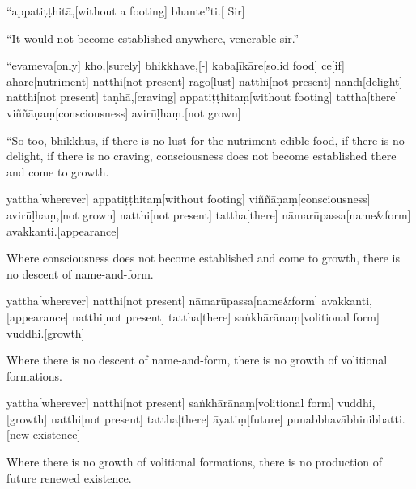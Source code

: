 \begin{samepage}
\begingl[glneveryline={\PaliGlossA,\PaliGlossB}]
“appatiṭṭhitā,[without a footing] bhante”ti.[ Sir]
\endgl
\nopagebreak
\linespread{0.5}
\begin{spacin}{0.2}
{\PaliGlossFT “It would not become established anywhere, venerable sir.”}
\end{spacin}
\vskip 12pt
\end{samepage}
\begin{samepage}
\begingl[glneveryline={\PaliGlossA,\PaliGlossB}]
“evameva[only] kho,[surely] bhikkhave,[-] kabaḷīkāre[solid food] ce[if] āhāre[nutriment] natthi[not present] rāgo[lust] natthi[not present] nandī[delight] natthi[not present] taṇhā,[craving] appatiṭṭhitaṃ[without footing] tattha[there] viññāṇaṃ[consciousness] avirūḷhaṃ.[not grown]
\endgl
\nopagebreak
\linespread{0.5}
\begin{spacin}{0.2}
{\PaliGlossFT “So too, bhikkhus, if there is no lust for the nutriment edible food, if there is no delight, if there is no craving, consciousness does not become established there and come to growth.}
\end{spacin}
\vskip 12pt
\end{samepage}
\begin{samepage}
\begingl[glneveryline={\PaliGlossA,\PaliGlossB}]
yattha[wherever] appatiṭṭhitaṃ[without footing] viññāṇaṃ[consciousness] avirūḷhaṃ,[not grown] natthi[not present] tattha[there] nāmarūpassa[name\&form] avakkanti.[appearance]
\endgl
\nopagebreak
\linespread{0.5}
\begin{spacin}{0.2}
{\PaliGlossFT Where consciousness does not become established and come to growth, there is no descent of name-and-form.}
\end{spacin}
\vskip 12pt
\end{samepage}
\begin{samepage}
\begingl[glneveryline={\PaliGlossA,\PaliGlossB}]
yattha[wherever] natthi[not present] nāmarūpassa[name\&form] avakkanti,[appearance] natthi[not present] tattha[there] saṅkhārānaṃ[volitional form] vuddhi.[growth]
\endgl
\nopagebreak
\linespread{0.5}
\begin{spacin}{0.2}
{\PaliGlossFT Where there is no descent of name-and-form, there is no growth of volitional formations.}
\end{spacin}
\vskip 12pt
\end{samepage}
\begin{samepage}
\begingl[glneveryline={\PaliGlossA,\PaliGlossB}]
yattha[wherever] natthi[not present] saṅkhārānaṃ[volitional form] vuddhi,[growth] natthi[not present] tattha[there] āyatiṃ[future] punabbhavābhinibbatti.[new existence]
\endgl
\nopagebreak
\linespread{0.5}
\begin{spacin}{0.2}
{\PaliGlossFT Where there is no growth of volitional formations, there is no production of future renewed existence.}
\end{spacin}
\vskip 12pt
\end{samepage}
